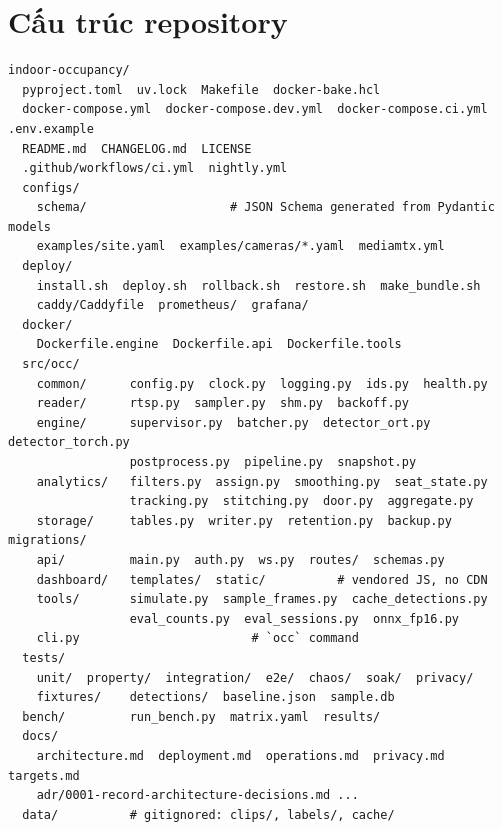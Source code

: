 \documentclass[10pt,a4paper,oneside,openany]{report}
\begin{document}
\chapter{Cấu trúc repository}\label{app:repo}
\begin{lstlisting}[caption={Cấu trúc đề xuất}]
indoor-occupancy/
  pyproject.toml  uv.lock  Makefile  docker-bake.hcl
  docker-compose.yml  docker-compose.dev.yml  docker-compose.ci.yml  .env.example
  README.md  CHANGELOG.md  LICENSE
  .github/workflows/ci.yml  nightly.yml
  configs/
    schema/                    # JSON Schema generated from Pydantic models
    examples/site.yaml  examples/cameras/*.yaml  mediamtx.yml
  deploy/
    install.sh  deploy.sh  rollback.sh  restore.sh  make_bundle.sh
    caddy/Caddyfile  prometheus/  grafana/
  docker/
    Dockerfile.engine  Dockerfile.api  Dockerfile.tools
  src/occ/
    common/      config.py  clock.py  logging.py  ids.py  health.py
    reader/      rtsp.py  sampler.py  shm.py  backoff.py
    engine/      supervisor.py  batcher.py  detector_ort.py  detector_torch.py
                 postprocess.py  pipeline.py  snapshot.py
    analytics/   filters.py  assign.py  smoothing.py  seat_state.py
                 tracking.py  stitching.py  door.py  aggregate.py
    storage/     tables.py  writer.py  retention.py  backup.py  migrations/
    api/         main.py  auth.py  ws.py  routes/  schemas.py
    dashboard/   templates/  static/          # vendored JS, no CDN
    tools/       simulate.py  sample_frames.py  cache_detections.py
                 eval_counts.py  eval_sessions.py  onnx_fp16.py
    cli.py                        # `occ` command
  tests/
    unit/  property/  integration/  e2e/  chaos/  soak/  privacy/
    fixtures/    detections/  baseline.json  sample.db
  bench/         run_bench.py  matrix.yaml  results/
  docs/
    architecture.md  deployment.md  operations.md  privacy.md  targets.md
    adr/0001-record-architecture-decisions.md ...
  data/          # gitignored: clips/, labels/, cache/
\end{lstlisting}
\end{document}

